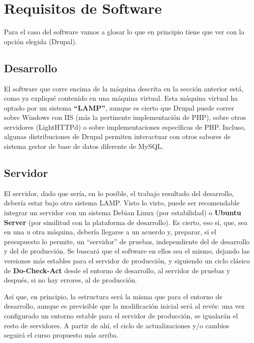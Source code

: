 \section{Requisitos de Software}
\par Para el caso del software vamos a glosar lo que en principio tiene que ver con la opción elegida (Drupal).

\subsection{Desarrollo}
\par El software que corre encima de la máquina descrita en la sección anterior está, como ya expliqué contenido en una máquina virtual. Esta máquina virtual ha optado por un sistema \textbf{``LAMP''}, aunque es cierto que Drupal puede correr sobre Windows con IIS (más la pertinente implementación de PHP), sobre otros servidores (LightHTTPd) o sobre implementaciones específicas de PHP. Incluso, algunas distribuciones de Drupal permiten interactuar con otros sabores de sistema gestor de base de datos diferente de MySQL.

\subsection{Servidor}

\par El servidor, dado que sería, en lo posible, el trabajo resultado del desarrollo, debería estar bajo otro sistema LAMP. Visto lo visto, puede ser recomendable integrar un servidor con un sistema Debian Linux (por estabilidad) o \textbf{Ubuntu Server} (por similitud con la plataforma de desarrollo). Es cierto, eso sí, que, sea en una u otra máquina, debería llegarse a un acuerdo y, preparar, si el presupuesto lo permite, un ``servidor'' de pruebas, independiente del de desarrollo y del de producción. Se buscará que el software en ellos sea el mismo, dejando las versiones más estables para el servidor de producción, y siguiendo un ciclo clásico de \textbf{Do-Check-Act}\label{cha:docheckact} desde el entorno de desarrollo, al servidor de pruebas y después, si no hay errores, al de producción.

\par Así que, en principio, la estructura será la misma que para el entorno de desarrollo, aunque es previsible que la modificación inicial será al revés: una vez configurado un entorno estable para el servidor de producción, se igualarán el resto de servidores. A partir de ahí, el ciclo de actualizaciones y/o cambios seguirá el curso propuesto más arriba.

